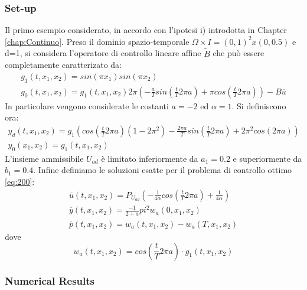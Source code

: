 \subsubsection{Set-up}
Il primo esempio considerato, in accordo con l'ipotesi i) introdotta in Chapter \ref{chap:Continuo}.
Preso il dominio spazio-temporale $\Omega \times I = (0,1)^2 x(0,0.5)$ e d=1, si considera l'operatore di controllo lineare affine $\tilde{B}$ che può essere completamente caratterizato da:
{\renewcommand\arraystretch{2}
\begin{equation}
\begin{array}{c}
g_1(t,x_1,x_2) = sin({\pi}x_1)sin({\pi}x_2)\\
g_0(t,x_1,x_2) = g_1(t,x_1,x_2) 2\pi \left( -\frac{a}{T}sin\left( \frac{t}{T}2{\pi}a \right) + \pi cos\left( \frac{t}{T}2{\pi}a \right) \right) - B\overline{u}
\end{array}
\label{eq:505}
\end{equation}
}
In particolare vengono considerate le costanti $a=-2$ ed $\alpha=1$.
Si definiscono ora:
{\renewcommand\arraystretch{2}
\begin{equation}
\begin{array}{c}
y_d(t,x_1,x_2) = g_1\left( cos\left( \frac{t}{T}2{\pi}a \right)(1-2{\pi}^2) -\frac{2{\pi}a}{T}sin\left( \frac{t}{T}2{\pi}a \right) +2{\pi}^2cos(2{\pi}a) \right)\\
y_0(x_1,x_2) = g_1(t,x_1,x_2)
\end{array}
\label{eq:506}
\end{equation}
}
L'insieme ammissibile $U_{ad}$ è limitato inferiormente da $a_1=0.2$ e superiormente da $b_1=0.4$.
Infine definiamo le soluzioni esatte per il problema di controllo ottimo \ref{eq:200}:
{\renewcommand\arraystretch{2}
\begin{equation}
\begin{array}{c}
\overline{u}(t,x_1,x_2) = P_{U_{ad}} \left( -\frac{1}{4\alpha}cos \left( \frac{t}{T}2{\pi}a \right) +\frac{1}{4\alpha} \right) \\
\overline{y}(t,x_1,x_2) = \frac{- 1}{2 + a}{pi}^2w_a(0,x_1,x_2) \\
\overline{p}(t,x_1,x_2) = w_a(t,x_1,x_2) - w_a(T,x_1,x_2)
\end{array}
\label{eq:507}
\end{equation}
}
dove
\begin{equation}
w_a(t,x_1,x_2) = cos \left( \frac{t}{T}2{\pi}a \right) \cdot g_1(t,x_1,x_2)
\label{eq:508}
\end{equation}

\subsubsection{Numerical Results}